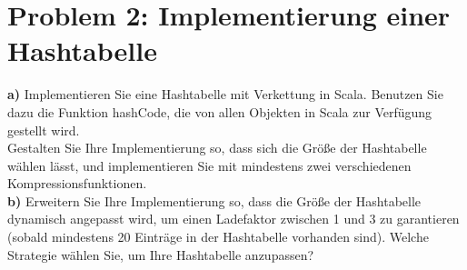 \section*{{Problem 2: Implementierung einer Hashtabelle}} 


\noindent
\textbf{a)} Implementieren Sie eine Hashtabelle mit Verkettung in Scala. Benutzen Sie dazu die Funktion hashCode, die von allen Objekten in Scala zur Verfügung gestellt wird.\\
Gestalten Sie Ihre Implementierung so, dass sich die Größe der Hashtabelle wählen lässt, und implementieren Sie mit mindestens zwei verschiedenen Kompressionsfunktionen.\\

\noindent
\textbf{b)} Erweitern Sie Ihre Implementierung so, dass die Größe der Hashtabelle dynamisch angepasst wird, um einen Ladefaktor zwischen 1 und 3 zu garantieren (sobald mindestens 20 Einträge in der Hashtabelle vorhanden sind). Welche Strategie wählen Sie, um Ihre Hashtabelle anzupassen?\\